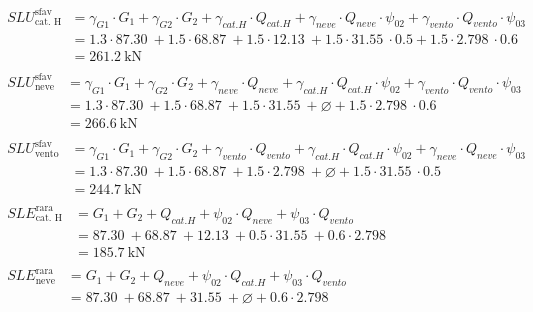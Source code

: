 \begin{align} 
	\begin{split}
	SLU^{\text{sfav}}_{\text{cat. H}} &= \gamma_{G1}\cdot G_1 + \gamma_{G2} \cdot G_2 + \gamma_{cat. H} \cdot Q_{cat. H} + \gamma_{neve}\cdot Q_{neve}\cdot\psi_{02} + \gamma_{vento}\cdot Q_{vento} \cdot \psi_{03}  \\
	&= 1.3\cdot\SI{87.30}{} + 1.5\cdot\SI{68.87}{} + 1.5\cdot\SI{12.13}{} + 1.5\cdot\SI{31.55}{}\cdot0.5 + 1.5\cdot\SI{2.798}{}\cdot0.6\\
	&= \SI{261.2}{\kilo\newton}
	\end{split} \\ 
	\begin{split}
	SLU^{\text{sfav}}_{\text{neve}} &= \gamma_{G1}\cdot G_1 + \gamma_{G2} \cdot G_2 + \gamma_{neve}\cdot Q_{neve} + \gamma_{cat. H} \cdot Q_{cat. H}\cdot\psi_{02} + \gamma_{vento}\cdot Q_{vento} \cdot \psi_{03}  \\
	&= 1.3\cdot\SI{87.30}{} + 1.5\cdot\SI{68.87}{} + 1.5\cdot\SI{31.55}{} + \varnothing + 1.5\cdot\SI{2.798}{}\cdot0.6\\
	&= \SI{266.6}{\kilo\newton}
	\end{split} \\ 
	\begin{split}
	SLU^{\text{sfav}}_{\text{vento}} &= \gamma_{G1}\cdot G_1 + \gamma_{G2} \cdot G_2 + \gamma_{vento}\cdot Q_{vento} + \gamma_{cat. H} \cdot Q_{cat. H}\cdot\psi_{02} + \gamma_{neve}\cdot Q_{neve} \cdot \psi_{03}  \\
	&= 1.3\cdot\SI{87.30}{} + 1.5\cdot\SI{68.87}{} + 1.5\cdot\SI{2.798}{} + \varnothing + 1.5\cdot\SI{31.55}{}\cdot0.5\\
	&= \SI{244.7}{\kilo\newton}
	\end{split} \\ 
	\begin{split}
	SLE^{\text{rara}}_{\text{cat. H}} &= G_1 + G_2 + Q_{cat. H} + \psi_{02}\cdot Q_{neve} + \psi_{03}\cdot Q_{vento}  \\
	&= \SI{87.30}{} + \SI{68.87}{} + \SI{12.13}{} + 0.5\cdot\SI{31.55}{} + 0.6\cdot\SI{2.798}{}\\
	&= \SI{185.7}{\kilo\newton}
	\end{split} \\ 
	\begin{split}
	SLE^{\text{rara}}_{\text{neve}} &= G_1 + G_2 + Q_{neve} + \psi_{02}\cdot Q_{cat. H} + \psi_{03}\cdot Q_{vento}  \\
	&= \SI{87.30}{} + \SI{68.87}{} + \SI{31.55}{} + \varnothing + 0.6\cdot\SI{2.798}{}\\

\end{split}
\end{align}
